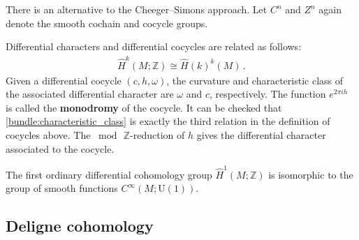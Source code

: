     There is an alternative to the Cheeger--Simons approach. Let $C^n$ and $Z^n$ again denote the smooth cochain and cocycle groups.
    \begin{property}
        Differential characters and differential cocycles are related as follows:
        \begin{gather}
            \hat{H}^k(M;\mathbb{Z})\cong\hat{H}(k)^k(M)\,.
        \end{gather}
        Given a differential cocycle $(c,h,\omega)$, the curvature and characteristic class of the associated differential character are $\omega$ and $c$, respectively. The function $e^{2\pi ih}$ is called the \textbf{monodromy} of the cocycle. It can be checked that \cref{bundle:characteristic_class} is exactly the third relation in the definition of cocycles above. The $\bmod\,\mathbb{Z}$-reduction of $h$ gives the differential character associated to the cocycle.
    \end{property}

    \begin{example}
        The first ordinary differential cohomology group $\hat{H}^1(M;\mathbb{Z})$ is isomorphic to the group of smooth functions $C^\infty(M;\mathrm{U}(1))$.
    \end{example}

\subsection{Deligne cohomology}

